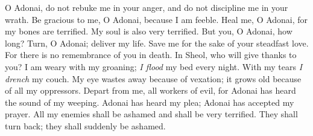 \begin{biblechapter} %
 O Adonai, do not rebuke me in your anger, 
and do not discipline me in your wrath.
\verse Be gracious to me, O Adonai, because I am feeble. 
Heal me, O Adonai, for my bones are terrified.
\verse My soul is also very terrified. 
But you, O Adonai, how long?
\verse Turn, O Adonai; deliver my life. 
Save me for the sake of your steadfast love.
\verse For there is no remembrance of you in death. 
In Sheol, who will give thanks to you?
\verse I am weary with my groaning; 
\textit{I flood} my bed every night. 
With my tears \textit{I drench} my couch.
\verse My eye wastes away because of vexation; 
it grows old because of all my oppressors.
\verse Depart from me, all workers of evil, 
for Adonai has heard the sound of my weeping.
\verse Adonai has heard my plea; 
Adonai has accepted my prayer.
\verse All my enemies shall be ashamed and shall be very terrified. 
They shall turn back; they shall suddenly be ashamed.
\end{biblechapter}

